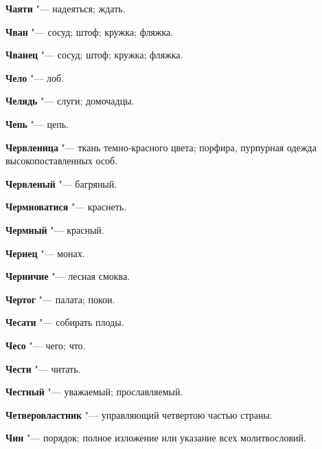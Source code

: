 \begin{mymulticols}{2}
\noindent\textbf{Чаяти} "--- надеяться; ждать. 




\noindent\textbf{Чван} "--- сосуд; штоф; кружка; фляжка. 




\noindent\textbf{Чванец} "--- сосуд; штоф; кружка; фляжка. 




\noindent\textbf{Чело} "--- лоб. 




\noindent\textbf{Челядь} "--- слуги; домочадцы. 




\noindent\textbf{Чепь} "--- цепь. 




\noindent\textbf{Червленица} "--- ткань темно-красного цвета; порфира, пурпурная одежда высокопоставленных особ. 




\noindent\textbf{Червленый} "--- багряный. 




\noindent\textbf{Чермноватися} "--- краснеть. 




\noindent\textbf{Чермный} "--- красный. 




\noindent\textbf{Чернец} "--- монах. 




\noindent\textbf{Черничие} "--- лесная смоква. 




\noindent\textbf{Чертог} "--- палата; покои. 




\noindent\textbf{Чесати} "--- собирать плоды. 




\noindent\textbf{Чесо} "--- чего; что. 




\noindent\textbf{Чести} "--- читать. 




\noindent\textbf{Честный} "--- уважаемый; прославляемый. 




\noindent\textbf{Четверовластник} "--- управляющий четвертою частью страны. 




\noindent\textbf{Чин} "--- порядок; полное изложение или указание всех молитвословий. 





\end{mymulticols}
